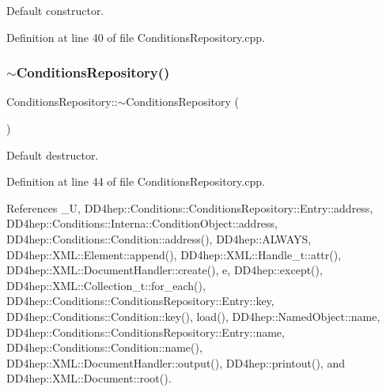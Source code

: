 Default constructor. 



Definition at line 40 of file Conditions\+Repository.\+cpp.

\hypertarget{class_d_d4hep_1_1_conditions_1_1_conditions_repository_a0c539a83a34e2a2fb3d0bab9586ec3e6}{}\label{class_d_d4hep_1_1_conditions_1_1_conditions_repository_a0c539a83a34e2a2fb3d0bab9586ec3e6} 
\subsubsection{\texorpdfstring{$\sim$\+Conditions\+Repository()}{~ConditionsRepository()}}
{\footnotesize\ttfamily Conditions\+Repository\+::$\sim$\+Conditions\+Repository (\begin{DoxyParamCaption}{ }\end{DoxyParamCaption})\hspace{0.3cm}{\ttfamily [virtual]}}



Default destructor. 



Definition at line 44 of file Conditions\+Repository.\+cpp.



References \+\_\+U, D\+D4hep\+::\+Conditions\+::\+Conditions\+Repository\+::\+Entry\+::address, D\+D4hep\+::\+Conditions\+::\+Interna\+::\+Condition\+Object\+::address, D\+D4hep\+::\+Conditions\+::\+Condition\+::address(), D\+D4hep\+::\+A\+L\+W\+A\+YS, D\+D4hep\+::\+X\+M\+L\+::\+Element\+::append(), D\+D4hep\+::\+X\+M\+L\+::\+Handle\+\_\+t\+::attr(), D\+D4hep\+::\+X\+M\+L\+::\+Document\+Handler\+::create(), e, D\+D4hep\+::except(), D\+D4hep\+::\+X\+M\+L\+::\+Collection\+\_\+t\+::for\+\_\+each(), D\+D4hep\+::\+Conditions\+::\+Conditions\+Repository\+::\+Entry\+::key, D\+D4hep\+::\+Conditions\+::\+Condition\+::key(), load(), D\+D4hep\+::\+Named\+Object\+::name, D\+D4hep\+::\+Conditions\+::\+Conditions\+Repository\+::\+Entry\+::name, D\+D4hep\+::\+Conditions\+::\+Condition\+::name(), D\+D4hep\+::\+X\+M\+L\+::\+Document\+Handler\+::output(), D\+D4hep\+::printout(), and D\+D4hep\+::\+X\+M\+L\+::\+Document\+::root().



